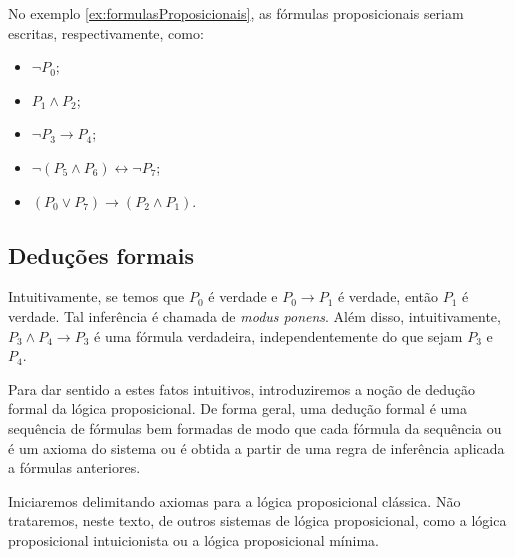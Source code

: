 No exemplo \ref{ex:formulasProposicionais}, as fórmulas proposicionais seriam escritas, respectivamente, como:
\begin{itemize}
    \item $\neg P_0$;
    \item $P_1 \wedge P_2$;
    \item $\neg P_3 \rightarrow P_4$;
    \item $\neg(P_5 \wedge P_6) \leftrightarrow \neg P_7$;
    \item $(P_0 \vee P_7) \rightarrow (P_2 \wedge P_1)$.
\end{itemize}

\subsection{Deduções formais}\label{subsec:deducoesFormaisProposicionais}

Intuitivamente, se temos que $P_0$ é verdade e $P_0\rightarrow P_1$ é verdade, então $P_1$ é verdade.
Tal inferência é chamada de \emph{modus ponens}.
Além disso, intuitivamente, $P_3\land P_4\rightarrow P_3$ é uma fórmula verdadeira, independentemente do que sejam $P_3$ e $P_4$.

Para dar sentido a estes fatos intuitivos, introduziremos a noção de dedução formal da lógica proposicional.
De forma geral, uma dedução formal é uma sequência de fórmulas bem formadas de modo que cada fórmula da sequência ou é um axioma do sistema ou é obtida a partir de uma regra de inferência aplicada a fórmulas anteriores.

Iniciaremos delimitando axiomas para a lógica proposicional clássica.
Não trataremos, neste texto, de outros sistemas de lógica proposicional, como a lógica proposicional intuicionista ou a lógica proposicional mínima.

